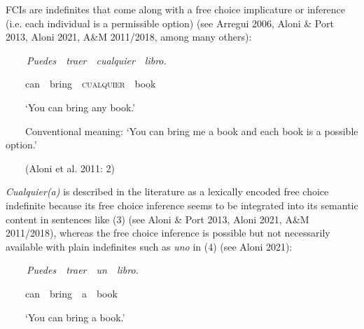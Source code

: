 \begin{styleStandard}
FCIs are indefinites that come along with a free choice implicature or inference (i.e. each individual is a permissible option) (see Arregui 2006, Aloni \& Port 2013, Aloni 2021, A\&M 2011/2018, among many others): 
\end{styleStandard}

\begin{styleStandard}
\textbf{\ \ }\ \ \textit{Puedes}\ \ \textit{traer}\ \ \textit{cualquier}\ \ \textit{libro.}\ \ \ \ 
\end{styleStandard}

\begin{styleStandard}
\ \ \ \ can\ \ bring\ \ \textsc{cualquier}\ \ book\ \ \ \ 
\end{styleStandard}

\begin{styleStandard}
\ \ \ \ ‘You can bring any book.’
\end{styleStandard}

\begin{styleStandard}
\ \ \ \ Conventional meaning: ‘You can bring me a book and each book is a possible option.’
\end{styleStandard}

\begin{styleStandard}
\ \ \ \ (Aloni et al. 2011: 2)
\end{styleStandard}

\begin{styleStandard}
\textit{Cualquier(a)} is described in the literature as a lexically encoded free choice indefinite because its free choice inference seems to be integrated into its semantic content in sentences like (3) (see Aloni \& Port 2013, Aloni 2021, A\&M 2011/2018), whereas the free choice inference is possible but not necessarily available with plain indefinites such as \textit{uno} in (4) (see Aloni 2021):
\end{styleStandard}

\begin{styleStandard}
\textbf{\ \ }\ \ \textit{Puedes}\ \ \textit{traer}\ \ \textit{un}\ \ \textit{libro.}\ \ \ \ 
\end{styleStandard}

\begin{styleStandard}
\ \ \ \ can\ \ bring\ \ a\ \ book\ \ \ \ 
\end{styleStandard}

\begin{styleStandard}
\ \ \ \ ‘You can bring a book.’
\end{styleStandard}

